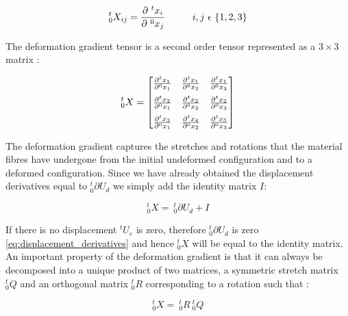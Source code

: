 \begin{equation}
^t_0X_{ij} = \frac{\partial \ ^tx_i}{\partial \ ^0x_j} \hspace{10mm}
i,j \ \epsilon \ \lbrace 1,2,3 \rbrace
\end{equation}

The deformation gradient tensor is a second order tensor represented
as a $3 \times 3$ matrix :

\begin{equation}
^t_0X =
\begin{bmatrix} 
  \frac{\partial ^t x_1}{\partial ^0 x_1} & 
  \frac{\partial ^t x_1}{\partial ^0 x_2} & 
  \frac{\partial ^t x_1}{\partial ^0 x_3}
\vspace{2mm} \\
  \frac{\partial ^t x_2}{\partial ^0 x_1} & 
  \frac{\partial ^t x_2}{\partial ^0 x_2} & 
  \frac{\partial ^t x_2}{\partial ^0 x_3}
\vspace{2mm} \\
  \frac{\partial ^t x_3}{\partial ^0 x_1} & 
  \frac{\partial ^t x_4}{\partial ^0 x_2} & 
  \frac{\partial ^t x_5}{\partial ^0 x_3} 
\end{bmatrix} 
\end{equation}

The deformation gradient captures the stretches and rotations that
the material fibres have undergone from the initial undeformed
configuration and to a deformed configuration.
Since we have already obtained the displacement derivatives equal to
$^t_0\partial U_d$ we simply add the identity
matrix $I$:

\begin{equation}
\label{eq:deformation_gradient_tensor}
^t_0X = \ ^t_0\partial U_d + I
\end{equation}

If there is no displacement $^tU_e$ is zero, therefore $^t_0\partial U_d$
is zero \eqref{eq:displacement_derivatives} and hence $^t_0X$ will be equal
to the identity matrix. 
An important property of the deformation gradient is that it can
always be decomposed into a unique product of two matrices, a
symmetric stretch matrix $^t_0Q$ and an orthogonal matrix $^t_0R$
corresponding to a rotation such that :

\begin{equation}
^t_0X = \ ^t_0R \ ^t_0Q
\end{equation}

